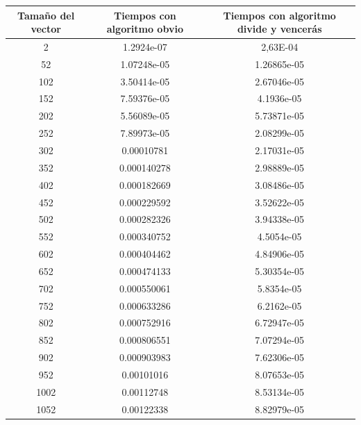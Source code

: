 \documentclass{article}
\begin{document}
	\begin{longtable}{|c|c|c|}
		\hline
		Tamaño del vector & Tiempos con algoritmo obvio & Tiempos con algoritmo divide y vencerás \\ \hline
		2	    &  1.2924e-07 	 &  2,63E-04  \\ \hline
		52	    &  1.07248e-05	 &  1.26865e-05  \\ \hline                  
		102	    &  3.50414e-05	 &  2.67046e-05  \\ \hline                  
		152	    &  7.59376e-05	 &  4.1936e-05   \\ \hline                 
		202	    &  5.56089e-05	 &  5.73871e-05  \\ \hline                  
		252	    &  7.89973e-05	 &  2.08299e-05  \\ \hline                  
		302	    &  0.00010781 	 &  2.17031e-05  \\ \hline                  
		352	    &  0.000140278	 &  2.98889e-05  \\ \hline                  
		402	    &  0.000182669	 &  3.08486e-05  \\ \hline                  
		452	    &  0.000229592	 &  3.52622e-05  \\ \hline                  
		502	    &  0.000282326	 &  3.94338e-05  \\ \hline                  
		552	    &  0.000340752	 &  4.5054e-05   \\ \hline                 
		602	    &  0.000404462	 &  4.84906e-05  \\ \hline                  
		652	    &  0.000474133	 &  5.30354e-05  \\ \hline                  
		702	    &  0.000550061	 &  5.8354e-05   \\ \hline                 
		752	    &  0.000633286	 &  6.2162e-05   \\ \hline                 
		802	    &  0.000752916	 &  6.72947e-05  \\ \hline                  
		852	    &  0.000806551	 &  7.07294e-05  \\ \hline                  
		902	    &  0.000903983	 &  7.62306e-05  \\ \hline                  
		952	    &  0.00101016 	 &  8.07653e-05  \\ \hline                  
		1002	&  0.00112748 	 &  8.53134e-05  \\ \hline                  
		1052	&  0.00122338 	 &  8.82979e-05  \\ \hline                  

\end{longtable}
\end{document}
